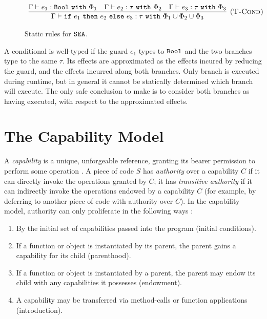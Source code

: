 \begin{figure}[h]


\[
\begin{array}{c}

\infer[\textsc{(T-Cond)}]
	{ \Gamma \vdash \cond{e_1}{e_2}{e_3}: \tau~\kw{with} \Phi_1 \cup \Phi_2 \cup \Phi_3 }
	{ \Gamma \vdash e_1: \Bool~\kw{with} \Phi_1 & \Gamma \vdash e_2: \tau~\kw{with} \Phi_2 & \Gamma \vdash e_3: \tau~\kw{with} \Phi_3 }
	
\end{array}
\]

\vspace{-12pt}
\caption{Static rules for $\mathtt{SEA}$.}
\label{fig:fxtute_static}
\end{figure}

A conditional is well-typed if the guard $e_1$ types to $\mathtt{Bool}$ and the two branches type to the same $\tau$. Its effects are approximated as the effects incured by reducing the guard, and the effects incurred along both branches. Only branch is executed during runtime, but in general it cannot be statically determined which branch will execute. The only safe conclusion to make is to consider both branches as having executed, with respect to the approximated effects.

\section{The Capability Model}

A \textit{capability} is a unique, unforgeable reference, granting its bearer permission to perform some operation \cite{dennis66}. A piece of code $S$ has \textit{authority} over a capability $C$ if it can directly invoke the operations granted by $C$; it has \textit{transitive authority} if it can indirectly invoke the operations endowed by a capability $C$ (for example, by deferring to another piece of code with authority over $C$).  In the capability model, authority can only proliferate in the following ways \cite{miller06}:

\begin{enumerate}
	\item By the initial set of capabilities passed into the program (initial conditions).
	\item If a function or object is instantiated by its parent, the parent gains a capability for its child (parenthood).
	\item If a function or object is instantiated by a parent, the parent may endow its child with any capabilities it possesses (endowment).
	\item A capability may be transferred via method-calls or function applications (introduction).
\end{enumerate}

